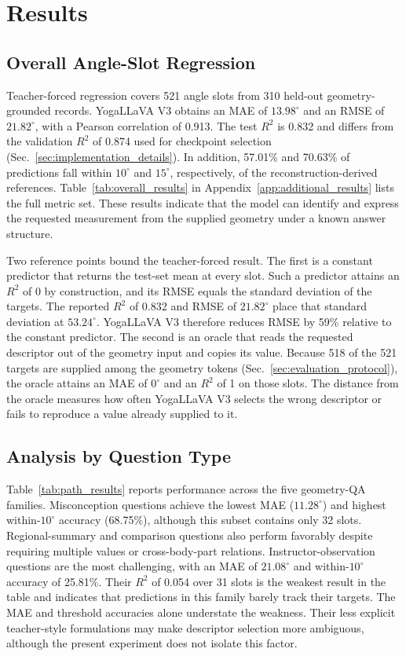 \section{Results}
\label{sec:results}

\subsection{Overall Angle-Slot Regression}
\label{sec:overall_results}

Teacher-forced regression covers 521 angle slots from 310 held-out geometry-grounded records.
YogaLLaVA V3 obtains an MAE of $13.98^\circ$ and an RMSE of $21.82^\circ$, with a Pearson correlation of 0.913.
The test $R^2$ is 0.832 and differs from the validation $R^2$ of 0.874 used for checkpoint selection (Sec.~\ref{sec:implementation_details}).
In addition, 57.01\% and 70.63\% of predictions fall within $10^\circ$ and $15^\circ$, respectively, of the reconstruction-derived references.
Table~\ref{tab:overall_results} in Appendix~\ref{app:additional_results} lists the full metric set.
These results indicate that the model can identify and express the requested measurement from the supplied geometry under a known answer structure.

Two reference points bound the teacher-forced result.
The first is a constant predictor that returns the test-set mean at every slot.
Such a predictor attains an $R^2$ of 0 by construction, and its RMSE equals the standard deviation of the targets.
The reported $R^2$ of 0.832 and RMSE of $21.82^\circ$ place that standard deviation at $53.24^\circ$.
YogaLLaVA V3 therefore reduces RMSE by 59\% relative to the constant predictor.
The second is an oracle that reads the requested descriptor out of the geometry input and copies its value.
Because 518 of the 521 targets are supplied among the geometry tokens (Sec.~\ref{sec:evaluation_protocol}), the oracle attains an MAE of $0^\circ$ and an $R^2$ of 1 on those slots.
The distance from the oracle measures how often YogaLLaVA V3 selects the wrong descriptor or fails to reproduce a value already supplied to it.


\subsection{Analysis by Question Type}
\label{sec:path_results}

Table~\ref{tab:path_results} reports performance across the five geometry-QA families.
Misconception questions achieve the lowest MAE ($11.28^\circ$) and highest within-$10^\circ$ accuracy (68.75\%), although this subset contains only 32 slots.
Regional-summary and comparison questions also perform favorably despite requiring multiple values or cross-body-part relations.
Instructor-observation questions are the most challenging, with an MAE of $21.08^\circ$ and within-$10^\circ$ accuracy of 25.81\%.
Their $R^2$ of 0.054 over 31 slots is the weakest result in the table and indicates that predictions in this family barely track their targets.
The MAE and threshold accuracies alone understate the weakness.
Their less explicit teacher-style formulations may make descriptor selection more ambiguous, although the present experiment does not isolate this factor.

